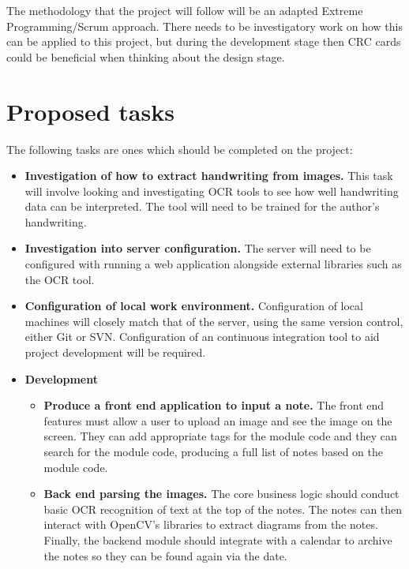 \documentclass[11pt,fleqn,twoside]{article}
\begin{document}
The methodology that the project will follow will be an adapted Extreme Programming/Scrum approach. There needs to be investigatory work on how this can be applied to this project, but during the development stage then CRC cards could be beneficial when thinking about the design stage.
\section{Proposed tasks}
The following tasks are ones which should be completed on the project:
\begin{itemize}

\item \textbf{Investigation of how to extract handwriting from images.} This task will involve looking and investigating OCR tools to see how well handwriting data can be interpreted. The tool will need to be trained for the author's handwriting.

\item \textbf{Investigation into server configuration.} The server will need to be configured with running a web application alongside external libraries such as the OCR tool.

\item \textbf{Configuration of local work environment.} Configuration of local machines will closely match that of the server, using the same version control, either Git or SVN. Configuration  of an continuous integration tool to aid project development will be required.

\item \textbf{Development}
  \begin{itemize}

    \item \textbf{Produce a front end application to input a note.} The front end features must allow a user to upload an image and see the image on the screen. They can add appropriate tags for the module code and they can search for the module code, producing a full list of notes based on the module code.

    \item \textbf{Back end parsing the images.} The core business logic should conduct basic OCR recognition of text at the top of the notes. The notes can then interact with OpenCV's libraries to extract diagrams from the notes. Finally, the backend module should integrate with a calendar to archive the notes so they can be found again via the date.


\end{itemize}
\end{itemize}
\end{document}

